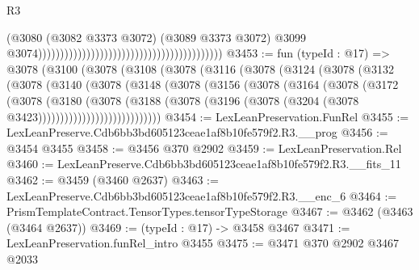 \begin{lexlean}{R3}
\begin{coremodule}
                                                                                      (@3080
                                                                                        (@3082
                                                                                          @3373
                                                                                          @3072)
                                                                                        (@3089
                                                                                          @3373
                                                                                          @3072)
                                                                                        @3099
                                                                                        @3074))))))))))))))))))))))))))))))))))))))))))
@3453 := fun (typeId : @17) =>
  @3078
    (@3100
      (@3078
        (@3108
          (@3078
            (@3116
              (@3078
                (@3124
                  (@3078
                    (@3132
                      (@3078
                        (@3140
                          (@3078
                            (@3148
                              (@3078
                                (@3156
                                  (@3078
                                    (@3164
                                      (@3078
                                        (@3172
                                          (@3078
                                            (@3180
                                              (@3078
                                                (@3188
                                                  (@3078
                                                    (@3196
                                                      (@3078
                                                        (@3204
                                                          (@3078 @3423))))))))))))))))))))))))))))
@3454 := LexLeanPreservation.FunRel
@3455 := LexLeanPreserve.Cdb6bb3bd605123ceae1af8b10fe579f2.R3.__prog
@3456 := @3454 @3455
@3458 := @3456 @370 @2902
@3459 := LexLeanPreservation.Rel
@3460 := LexLeanPreserve.Cdb6bb3bd605123ceae1af8b10fe579f2.R3.__fits_11
@3462 := @3459 (@3460 @2637)
@3463 := LexLeanPreserve.Cdb6bb3bd605123ceae1af8b10fe579f2.R3.__enc_6
@3464 := PrismTemplateContract.TensorTypes.tensorTypeStorage
@3467 := @3462 (@3463 (@3464 @2637))
@3469 := (typeId : @17) -> @3458 @3467
@3471 := LexLeanPreservation.funRel_intro @3455
@3475 := @3471 @370 @2902 @3467 @2033

\end{coremodule}
\end{lexlean}
